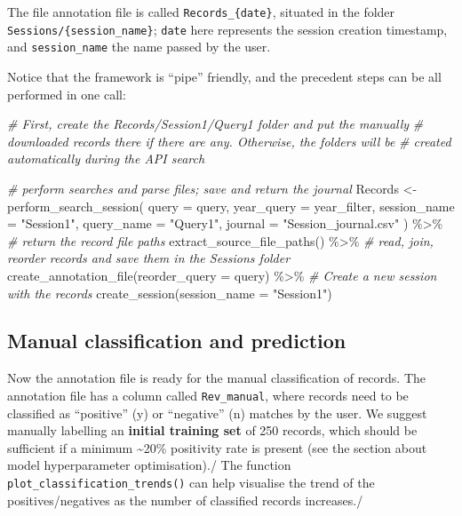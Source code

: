 \documentclass[
]{article}
\newenvironment{Shaded}{\begin{snugshade}}{\end{snugshade}}
\newcommand{\AttributeTok}[1]{\textcolor[rgb]{0.77,0.63,0.00}{#1}}
\newcommand{\CommentTok}[1]{\textcolor[rgb]{0.56,0.35,0.01}{\textit{#1}}}
\newcommand{\FunctionTok}[1]{\textcolor[rgb]{0.00,0.00,0.00}{#1}}
\newcommand{\NormalTok}[1]{#1}
\newcommand{\OtherTok}[1]{\textcolor[rgb]{0.56,0.35,0.01}{#1}}
\newcommand{\SpecialCharTok}[1]{\textcolor[rgb]{0.00,0.00,0.00}{#1}}
\newcommand{\StringTok}[1]{\textcolor[rgb]{0.31,0.60,0.02}{#1}}
\begin{document}
The file annotation file is called \texttt{Records\_\{date\}}, situated
in the folder \texttt{Sessions/\{session\_name\}}; \texttt{date} here
represents the session creation timestamp, and \texttt{session\_name}
the name passed by the user.

Notice that the framework is ``pipe'' friendly, and the precedent steps
can be all performed in one call:

\begin{Shaded}
\begin{Highlighting}[]
\CommentTok{\# First, create the Records/Session1/Query1 folder and put the manually}
\CommentTok{\# downloaded records there if there are any. Otherwise, the folders will be}
\CommentTok{\# created automatically during the API search}

\CommentTok{\# perform searches and parse files; save and return the journal}
\NormalTok{Records }\OtherTok{\textless{}{-}} \FunctionTok{perform\_search\_session}\NormalTok{(}
  \AttributeTok{query =}\NormalTok{ query, }\AttributeTok{year\_query =}\NormalTok{ year\_filter,}
  \AttributeTok{session\_name =} \StringTok{"Session1"}\NormalTok{, }\AttributeTok{query\_name =} \StringTok{"Query1"}\NormalTok{,}
  \AttributeTok{journal =} \StringTok{"Session\_journal.csv"}
\NormalTok{) }\SpecialCharTok{\%\textgreater{}\%}
  \CommentTok{\# return the record file paths}
  \FunctionTok{extract\_source\_file\_paths}\NormalTok{() }\SpecialCharTok{\%\textgreater{}\%}
  \CommentTok{\# read, join, reorder records and save them in the Sessions folder}
  \FunctionTok{create\_annotation\_file}\NormalTok{(}\AttributeTok{reorder\_query =}\NormalTok{ query) }\SpecialCharTok{\%\textgreater{}\%}
  \CommentTok{\# Create a new session with the records}
  \FunctionTok{create\_session}\NormalTok{(}\AttributeTok{session\_name =} \StringTok{"Session1"}\NormalTok{)}
\end{Highlighting}
\end{Shaded}

\hypertarget{manual-classification-and-prediction}{%
\subsection{Manual classification and
prediction}\label{manual-classification-and-prediction}}

Now the annotation file is ready for the manual classification of
records. The annotation file has a column called \texttt{Rev\_manual},
where records need to be classified as ``positive'' (y) or ``negative''
(n) matches by the user. We suggest manually labelling an
\textbf{initial training set} of 250 records, which should be sufficient
if a minimum \textasciitilde20\% positivity rate is present (see the
section about model hyperparameter optimisation)./ The function
\texttt{plot\_classification\_trends()} can help visualise the trend of
the positives/negatives as the number of classified records increases./
\end{document}
